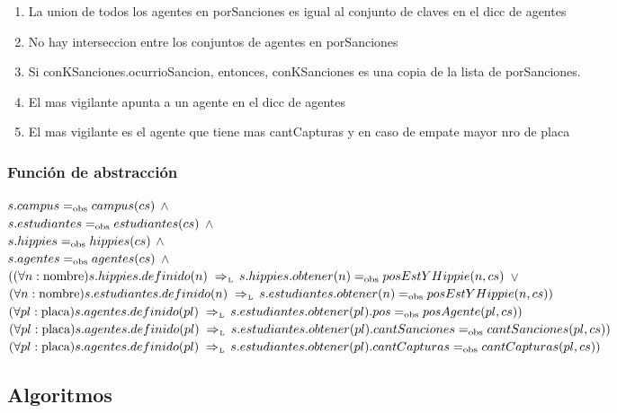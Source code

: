 \begin{enumerate}
  \item La union de todos los agentes en porSanciones es igual al conjunto de claves en el dicc de agentes
  \item No hay interseccion entre los conjuntos de agentes en porSanciones
  \item Si conKSanciones.ocurrioSancion, entonces, conKSanciones es una copia de la lista de porSanciones.
  \item El mas vigilante apunta a un agente en el dicc de agentes
  \item El mas vigilante es el agente que tiene mas cantCapturas y en caso de empate mayor nro de placa
  
\end{enumerate}


\subsubsection*{Función de abstracción}
$s.campus =_{\mathrm{obs}} campus(cs)$ $\land$ \\
$s.estudiantes =_{\mathrm{obs}} estudiantes(cs)$ $\land$ \\
$s.hippies =_{\mathrm{obs}} hippies(cs)$ $\land$ \\
$s.agentes =_{\mathrm{obs}} agentes(cs)$ $\land$ \\
$((\paratodo{nombre}{n}) s.hippies.definido(n) \impluego s.hippies.obtener(n) \igobs posEstYHippie(n,cs)$ $\lor$ \\
$(\paratodo{nombre}{n}) s.estudiantes.definido(n) \impluego s.estudiantes.obtener(n) \igobs posEstYHippie(n,cs))$ \\
$(\paratodo{placa}{pl}) s.agentes.definido(pl) \impluego s.estudiantes.obtener(pl).pos \igobs posAgente(pl,cs))$ \\
$(\paratodo{placa}{pl}) s.agentes.definido(pl) \impluego s.estudiantes.obtener(pl).cantSanciones \igobs cantSanciones(pl,cs))$ \\
$(\paratodo{placa}{pl}) s.agentes.definido(pl) \impluego s.estudiantes.obtener(pl).cantCapturas \igobs cantCapturas(pl,cs))$ \\

\newpage

\subsection{Algoritmos}


